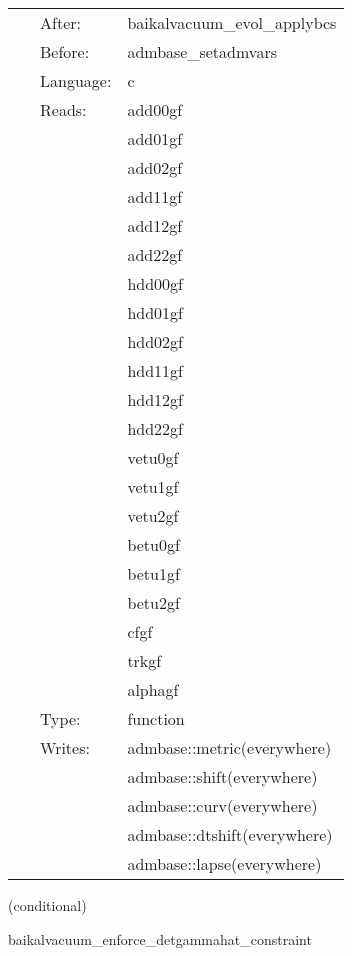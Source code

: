  \begin{tabular*}{160mm}{cll} 
~ & After:  & baikalvacuum\_evol\_applybcs \\ 
~ & Before:  & admbase\_setadmvars \\ 
~ & Language:  & c \\ 
~ & Reads:  & add00gf \\ 
~& ~ &add01gf\\ 
~& ~ &add02gf\\ 
~& ~ &add11gf\\ 
~& ~ &add12gf\\ 
~& ~ &add22gf\\ 
~& ~ &hdd00gf\\ 
~& ~ &hdd01gf\\ 
~& ~ &hdd02gf\\ 
~& ~ &hdd11gf\\ 
~& ~ &hdd12gf\\ 
~& ~ &hdd22gf\\ 
~& ~ &vetu0gf\\ 
~& ~ &vetu1gf\\ 
~& ~ &vetu2gf\\ 
~& ~ &betu0gf\\ 
~& ~ &betu1gf\\ 
~& ~ &betu2gf\\ 
~& ~ &cfgf\\ 
~& ~ &trkgf\\ 
~& ~ &alphagf\\ 
~ & Type:  & function \\ 
~ & Writes:  & admbase::metric(everywhere) \\ 
~& ~ &admbase::shift(everywhere)\\ 
~& ~ &admbase::curv(everywhere)\\ 
~& ~ &admbase::dtshift(everywhere)\\ 
~& ~ &admbase::lapse(everywhere)\\ 
\end{tabular*} 


\vspace{5mm}

   (conditional) 

\hspace{5mm} baikalvacuum\_enforce\_detgammahat\_constraint 

\hspace{5mm}{\it enforce detgammabar = detgammahat (= 1 in cartesian) } 


\hspace{5mm}

